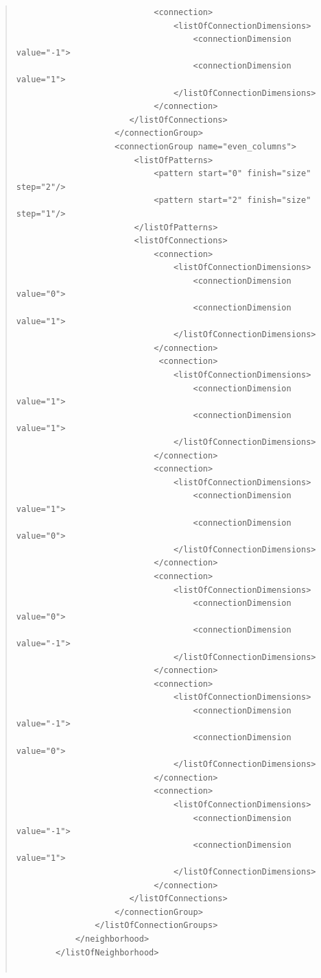 \documentclass[10pt]{article}
\begin{document}
\begin{quote}
\begin{small}
\begin{verbatim}
                            <connection>
                                <listOfConnectionDimensions>
                                    <connectionDimension value="-1">
                                    <connectionDimension value="1">
                                </listOfConnectionDimensions>
                            </connection>
                       </listOfConnections>
                    </connectionGroup>
                    <connectionGroup name="even_columns">
                        <listOfPatterns>
                            <pattern start="0" finish="size" step="2"/>
                            <pattern start="2" finish="size" step="1"/>
                        </listOfPatterns>
                        <listOfConnections>
                            <connection>
                                <listOfConnectionDimensions>
                                    <connectionDimension value="0">
                                    <connectionDimension value="1">
                                </listOfConnectionDimensions>
                            </connection>
                             <connection>
                                <listOfConnectionDimensions>
                                    <connectionDimension value="1">
                                    <connectionDimension value="1">
                                </listOfConnectionDimensions>
                            </connection>
                            <connection>
                                <listOfConnectionDimensions>
                                    <connectionDimension value="1">
                                    <connectionDimension value="0">
                                </listOfConnectionDimensions>
                            </connection>
                            <connection>
                                <listOfConnectionDimensions>
                                    <connectionDimension value="0">
                                    <connectionDimension value="-1">
                                </listOfConnectionDimensions>
                            </connection>
                            <connection>
                                <listOfConnectionDimensions>
                                    <connectionDimension value="-1">
                                    <connectionDimension value="0">
                                </listOfConnectionDimensions>
                            </connection>
                            <connection>
                                <listOfConnectionDimensions>
                                    <connectionDimension value="-1">
                                    <connectionDimension value="1">
                                </listOfConnectionDimensions>
                            </connection>
                       </listOfConnections>
                    </connectionGroup>
                </listOfConnectionGroups>
            </neighborhood>
        </listOfNeighborhood>


\end{verbatim}
\end{small}
\end{quote}
\end{document}
